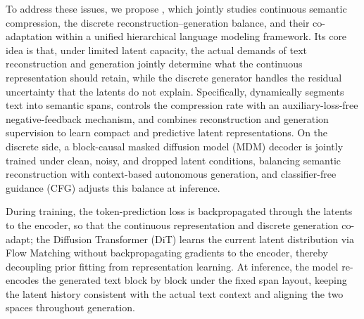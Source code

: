 To address these issues, we propose \method, which jointly studies continuous semantic compression, the discrete reconstruction--generation balance, and their co-adaptation within a unified hierarchical language modeling framework. Its core idea is that, under limited latent capacity, the actual demands of text reconstruction and generation jointly determine what the continuous representation should retain, while the discrete generator handles the residual uncertainty that the latents do not explain. Specifically, \method dynamically segments text into semantic spans, controls the compression rate with an auxiliary-loss-free negative-feedback mechanism, and combines reconstruction and generation supervision to learn compact and predictive latent representations. On the discrete side, a block-causal masked diffusion model (MDM) decoder \citep{sahoo2024simple,arriola2025block} is jointly trained under clean, noisy, and dropped latent conditions, balancing semantic reconstruction with context-based autonomous generation, and classifier-free guidance (CFG) \citep{ho2022classifier} adjusts this balance at inference.

During training, the token-prediction loss is backpropagated through the latents to the encoder, so that the continuous representation and discrete generation co-adapt; the Diffusion Transformer (DiT) \citep{peebles2023scalable} learns the current latent distribution via Flow Matching \citep{lipman2023flow} without backpropagating gradients to the encoder, thereby decoupling prior fitting from representation learning. At inference, the model re-encodes the generated text block by block under the fixed span layout, keeping the latent history consistent with the actual text context and aligning the two spaces throughout generation.

